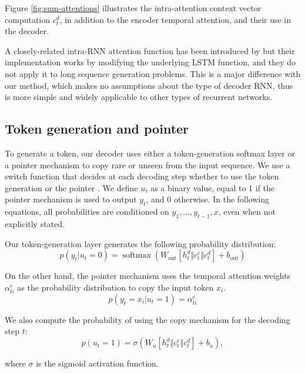 \documentclass{article} \usepackage{iclr2018_arxiv,times}
\DeclareMathOperator{\softmax}{softmax}
\begin{document}
Figure \ref{fig:sum-attentions} illustrates the intra-attention context vector computation $c^d_t$, in addition to the encoder temporal attention, and their use in the decoder.

A closely-related intra-RNN attention function has been introduced by \citet{cheng2016} but their implementation works by modifying the underlying LSTM function, and they do not apply it to long sequence generation problems. This is a major difference with our method, which makes no assumptions about the type of decoder RNN, thus is more simple and widely applicable to other types of recurrent networks.

\subsection{Token generation and pointer}
\label{ssec:output-layer}

To generate a token, our decoder uses either a token-generation softmax layer or a pointer mechanism to copy rare or unseen from the input sequence. We use a switch function that decides at each decoding step whether to use the token generation or the pointer \citep{gulcehre2016,nallapati2016}. We define $u_t$ as a binary value, equal to 1 if the pointer mechanism is used to output $y_t$, and 0 otherwise. In the following equations, all probabilities are conditioned on $y_1, \ldots, y_{t-1}, x$, even when not explicitly stated.


Our token-generation layer generates the following probability distribution:
\begin{equation}
p(y_t | u_t = 0) = \softmax(W_\textrm{out} [h^{d}_t \Vert c^e_t \Vert c^d_t] + b_\textrm{out})
\label{eq:output-layer}
\end{equation}

On the other hand, the pointer mechanism uses the temporal attention weights $\alpha^e_{ti}$ as the probability distribution to copy the input token $x_i$.
\begin{equation}
p(y_t = x_i |  u_t = 1 ) = \alpha^e_{ti}
\label{eq:pointer}
\end{equation}

We also compute the probability of using the copy mechanism for the decoding step $t$:
\begin{equation}
p(u_t = 1) = \sigma(W_{u} [h^{d}_t \Vert c^e_t \Vert c^d_t] + b_u),
\label{eq:pointer-switch}
\end{equation}

where $\sigma$ is the sigmoid activation function.
\end{document}
